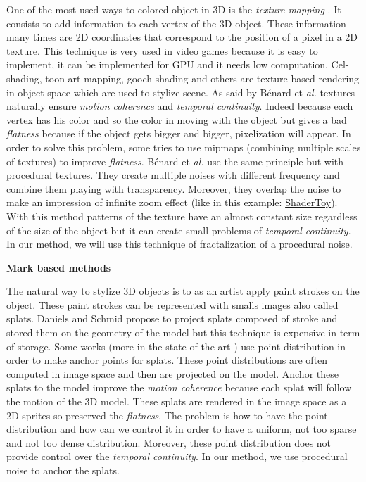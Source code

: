 One of the most used ways to colored object in 3D is the \textit{texture mapping} \cite{texture_mapping}. It consists to add information to each vertex of the 3D object. These information many times are 2D coordinates that correspond to the position of a pixel in a 2D texture. This technique is very used in video games because it is easy to implement, it can be implemented for GPU and it needs low computation. Cel-shading, toon art mapping, gooch shading and others\cite{benard_state---art_2011} are texture based rendering in object space\cite{praun_real-time_2001, klein_non-photorealistic_2000, benard_dynamic_2009, benard_dynamic_2010, freudenberg_walk-through_2001} which are used to stylize scene. As said by Bénard et \textit{al.} \cite{benard_dynamic_2009} textures naturally ensure \textit{motion coherence} and \textit{temporal continuity}. Indeed because each vertex has his color and so the color in moving with the object but gives a bad \textit{flatness} because if the object gets bigger and bigger, pixelization will appear. In order to solve this problem, some\cite{klein_non-photorealistic_2000, benard_dynamic_2009} tries to use mipmaps (combining multiple scales of textures) to improve \textit{flatness}. Bénard et \textit{al.}\cite{benard_dynamic_2010} use the same principle but with procedural textures. They create multiple noises with different frequency and combine them playing with transparency. Moreover, they overlap the noise to make an impression of infinite zoom effect (like in this example: \href{https://www.shadertoy.com/view/XlBXWw?fbclid=IwAR1fU2JxQzXtks1ZcmVmzrHiv646G8w2gWceeiV-UToeFkAFMQ2NecbsGGs}{ShaderToy}). With this method patterns of the texture have an almost constant size regardless of the size of the object but it can create small problems of \textit{temporal continuity}. In our method, we will use this technique of fractalization of a procedural noise. \newline


\textbf{Mark based methods}

The natural way to stylize 3D objects is to as an artist apply paint strokes on the object. These paint strokes can be represented with smalls images also called splats. Daniels\cite{Daniels_1999} and Schmid\cite{schmid_overcoat:_2011} propose to project splats composed of stroke and stored them on the geometry of the model but this technique is expensive in term of storage. Some works \cite{meier_painterly_1996, Fekete_2000, chi_stylized_2006}(more in the state of the art \cite{benard_state---art_2011}) use point distribution in order to make anchor points for splats. These point distributions are often computed in image space and then are projected on the model. Anchor these splats to the model improve the \textit{motion coherence} because each splat will follow the motion of the 3D model. These splats are rendered in the image space as a 2D sprites so preserved the \textit{flatness}. The problem is how to have the point distribution and how can we control it in order to have a uniform, not too sparse and not too dense distribution. Moreover, these point distribution does not provide control over the \textit{temporal continuity}. In our method, we use procedural noise to anchor the splats.


